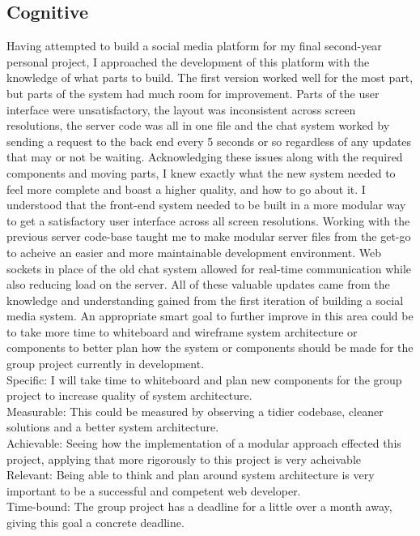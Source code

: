 \documentclass[lettersize,journal]{IEEEtran}
\begin{document}
\subsection{Cognitive}
Having attempted to build a social media platform for my final second-year personal project, I approached the development of this platform with the knowledge of what parts to build. The
first version worked well for the most part, but parts of the system had much room for improvement. Parts of the user interface were unsatisfactory, the layout was inconsistent across screen
resolutions, the server code was all in one file and the chat system worked by sending a request to the back end every 5 seconds or so regardless of any updates that may or not be waiting.
Acknowledging these issues along with the required components and moving parts, I knew exactly what the new system needed to feel more complete and boast a higher quality, and how to go about it.
I understood that the front-end system needed to be built in a more modular way to get a satisfactory user interface across all screen resolutions. Working with the previous server code-base
taught me to make modular server files from the get-go to acheive an easier and more maintainable development environment. Web sockets in place of the old chat system allowed for real-time
communication while also reducing load on the server. All of these valuable updates came from the knowledge and understanding gained from the first iteration of building a social media system.
An appropriate smart goal to further improve in this area could be to take more time to whiteboard and wireframe system architecture or components to better plan how the system or components should 
be made for the group project currently in development.
\\Specific: I will take time to whiteboard and plan new components for the group project to increase quality of system architecture.
\\Measurable: This could be measured by observing a tidier codebase, cleaner solutions and a better system architecture.
\\Achievable: Seeing how the implementation of a modular approach effected this project, applying that more rigorously to this project is very acheivable
\\Relevant: Being able to think and plan around system architecture is very important to be a successful and competent web developer.
\\Time-bound: The group project has a deadline for a little over a month away, giving this goal a concrete deadline.
\end{document}
